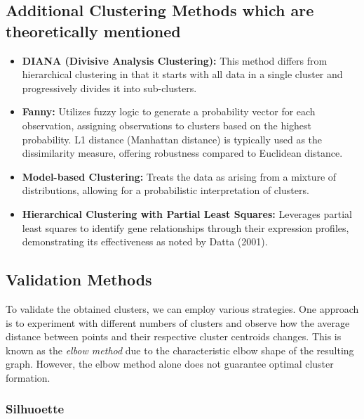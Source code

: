 \documentclass{llncs}
\begin{document}
\vspace{-30pt}

\subsection{Additional Clustering Methods which are theoretically mentioned}

\begin{itemize}
	\item \textbf{DIANA (Divisive Analysis Clustering):} This method differs from hierarchical clustering in that it starts with all data in a single cluster and progressively divides it into sub-clusters.\cite{datta2003}
	
	\item \textbf{Fanny:} Utilizes fuzzy logic to generate a probability vector for each observation, assigning observations to clusters based on the highest probability. L1 distance (Manhattan distance) is typically used as the dissimilarity measure, offering robustness compared to Euclidean distance. \cite{datta2003}
	
	\item \textbf{Model-based Clustering:} Treats the data as arising from a mixture of distributions, allowing for a probabilistic interpretation of clusters.\cite{datta2003}
	
	\item \textbf{Hierarchical Clustering with Partial Least Squares:} Leverages partial least squares to identify gene relationships through their expression profiles, demonstrating its effectiveness as noted by Datta (2001)\cite{datta2003}.
\end{itemize}

\subsection{Validation Methods}


To validate the obtained clusters, we can employ various strategies. One approach is to experiment with different numbers of clusters and observe how the average distance between points and their respective cluster centroids changes. This is known as the \textit{elbow method} due to the characteristic elbow shape of the resulting graph. However, the elbow method alone does not guarantee optimal cluster formation.\cite{Wang2018Thresher}

\subsubsection{Silhuoette}
\end{document}
